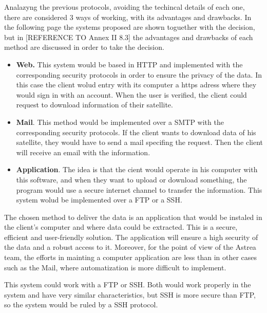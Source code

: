 Analazyng the previous protocols, avoiding the techincal details of each one, there are considered 3 ways of working, with its advantages and drawbacks. In the following page the systems proposed are shown toguether with the decision, but in [REFERENCE TO Annex II 8.3] the advantages and drawbacks of each method are discussed in order to take the decision.
\begin{itemize}
\item \textbf{Web.} This system would be based in HTTP and implemented with the corresponding security protocols in order to ensure the privacy of the data. In this case the client wolud entry with its computer a https adress where they would sign in with an account. When the user is verified, the client could request to download information of their satellite. 
\item \textbf{Mail}. This method would be implemented over a SMTP with the corresponding security protocols. If the client wants to download data of his satellite, they would have to send a mail specifing the request. Then the client will receive an email with the information.
\item \textbf{Application}.  The idea is that the cient would operate in his computer with this software, and when they want to upload or download something, the program would use a secure internet channel to transfer the information. This system wolud be implemented over a FTP or a SSH. 
\end{itemize}

The chosen method to deliver the data is an application that would be instaled in the client's computer and where data could be extracted. This is a secure, efficient and user-friendly solution. The application will ensure a high security of the data and a robust access to it. Moreover, for the point of view of the Astrea team, the efforts in mainting a computer application are less than in other cases such as the Mail, where automatization is more difficult to implement.

This system could work with a FTP or SSH. Both would work properly in the system and have very similar characteristics, but SSH is more secure than FTP, so the system would be ruled by a SSH protocol.